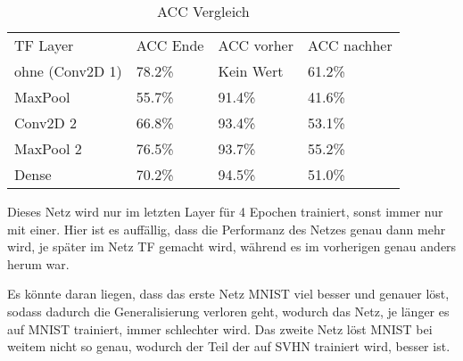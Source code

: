     \begin{table}[h!]
        \begin{center}
            \caption{ACC Vergleich}
            \label{tab2:Table}
            \begin{tabular}{l|l|l|l}
                TF Layer & ACC Ende & ACC vorher & ACC nachher \\
                ohne (Conv2D 1) & 78.2\% & Kein Wert & 61.2\% \\
                MaxPool & 55.7\% & 91.4\% & 41.6\% \\
                Conv2D 2 & 66.8\% & 93.4\% & 53.1\% \\
                MaxPool 2 & 76.5\% & 93.7\% & 55.2\% \\
                Dense & 70.2\% & 94.5\% & 51.0\% \\
            \end{tabular}
        \end{center}
    \end{table}
    Dieses Netz wird nur im letzten Layer für 4 Epochen trainiert, sonst immer nur mit einer. 
    Hier ist es auffällig, dass die Performanz des Netzes genau dann mehr wird, je später im Netz 
    TF gemacht wird, während es im vorherigen genau anders herum war. 

    Es könnte daran liegen, dass das erste Netz MNIST viel besser und genauer löst, sodass dadurch 
    die Generalisierung verloren geht, wodurch das Netz, je länger es auf MNIST trainiert, immer 
    schlechter wird. Das zweite Netz löst MNIST bei weitem nicht so genau, wodurch der Teil der auf 
    SVHN trainiert wird, besser ist. 
